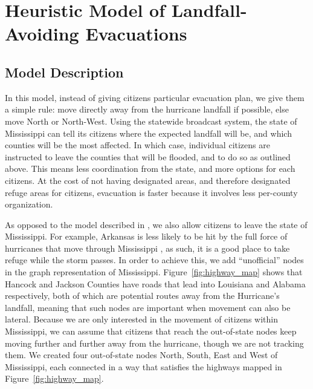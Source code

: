 \documentclass[titlepage]{article}
\begin{document}
\section{Heuristic Model of Landfall-Avoiding Evacuations}
\label{sec:heuristic}
  \subsection{Model Description}
    \par In this model, instead of giving citizens particular evacuation plan, we give them a simple rule: move directly away from the hurricane landfall if possible, else move North or North-West. Using the statewide broadcast system, the state of Mississippi can tell its citizens where the expected landfall will be, and which counties will be the most affected. In which case, individual citizens are instructed to leave the counties that will be flooded, and to do so as outlined above. This means less coordination from the state, and more options for each citizens. At the cost of not having designated areas, and therefore designated refuge areas for citizens, evacuation is faster because it involves less per-county organization.\\
    \par As opposed to the model described in , we also allow citizens to leave the state of Mississippi. For example, Arkansas is less likely to be hit by the full force of hurricanes that move through Mississippi \cite{5news}, as such, it is a good place to take refuge while the storm passes. In order to achieve this, we add ``unofficial'' nodes in the graph representation of Mississippi. Figure~\ref{fig:highway_map} shows that Hancock and Jackson Counties have roads that lead into Louisiana and Alabama respectively, both of which are potential routes away from the Hurricane's landfall, meaning that such nodes are important when movement can also be lateral. Because we are only interested in the movement of citizens within Mississippi, we can assume that citizens that reach the out-of-state nodes keep moving further and further away from the hurricane, though we are not tracking them. We created four out-of-state nodes North, South, East and West of Mississippi, each connected in a way that satisfies the highways mapped in Figure~\ref{fig:highway_map}.
\end{document}
